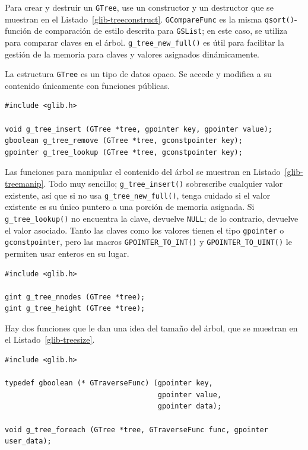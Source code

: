 Para crear y destruir un \lstinline{GTree}, use un constructor y un destructor que se muestran en el Listado~\ref{glib-treeconstruct}. \lstinline{GCompareFunc} es la misma \lstinline{qsort()}-función de comparación de estilo descrita para \lstinline{GSList}; en este caso, se utiliza para comparar claves en el árbol. \lstinline{g_tree_new_full()} es útil para facilitar la gestión de la memoria para claves y valores asignados dinámicamente.

La estructura \lstinline{GTree} es un tipo de datos opaco. Se accede y modifica a su contenido únicamente con funciones públicas.

\begin{lstlisting}[style=GLib/GTK, caption={Manipular el contenido de \lstinline{GTree}}, label=glib-treemanip]
#include <glib.h>

void g_tree_insert (GTree *tree, gpointer key, gpointer value);
gboolean g_tree_remove (GTree *tree, gconstpointer key);
gpointer g_tree_lookup (GTree *tree, gconstpointer key);
\end{lstlisting}

Las funciones para manipular el contenido del árbol se muestran en Listado~\ref{glib-treemanip}. Todo muy sencillo; \lstinline{g_tree_insert()} sobrescribe cualquier valor existente, así que si no usa \lstinline{g_tree_new_full()}, tenga cuidado si el valor existente es su único puntero a una porción de memoria asignada. Si \lstinline{g_tree_lookup()} no encuentra la clave, devuelve \lstinline{NULL}; de lo contrario, devuelve el valor asociado. Tanto las claves como los valores tienen el tipo \lstinline{gpointer} o \lstinline{gconstpointer}, pero las macros \lstinline{GPOINTER_TO_INT()} y \lstinline{GPOINTER_TO_UINT()} le permiten usar enteros en su lugar.

\begin{lstlisting}[style=GLib/GTK, caption={Determinar el tamaño de un \lstinline{GTree}}, label=glib-treesize]
#include <glib.h>

gint g_tree_nnodes (GTree *tree);
gint g_tree_height (GTree *tree);
\end{lstlisting}

Hay dos funciones que le dan una idea del tamaño del árbol, que se muestran en el Listado~\ref{glib-treesize}.

\begin{lstlisting}[style=GLib/GTK, caption={Atravesando un \lstinline{GTree}}, label=glib-treetraverse]
#include <glib.h>

typedef gboolean (* GTraverseFunc) (gpointer key,
                                    gpointer value,
                                    gpointer data);

void g_tree_foreach (GTree *tree, GTraverseFunc func, gpointer user_data);
\end{lstlisting}

